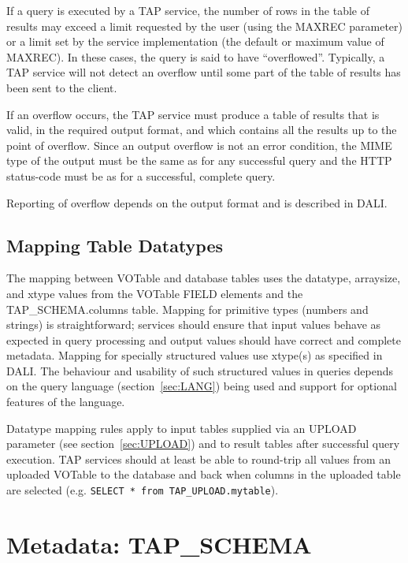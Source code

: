\documentclass[11pt,letter]{ivoa}
\begin{document}
If a query is executed by a TAP service, the number of rows in the table of 
results may exceed a limit requested by the user (using the MAXREC parameter) 
or a limit set by the service implementation (the default or maximum value of 
MAXREC). In these cases, the query is said to have ``overflowed''. Typically, a 
TAP service will not detect an overflow until some part of the table of results 
has been sent to the client.

If an overflow occurs, the TAP service must produce a table of results that is 
valid, in the required output format, and which contains all the results up to 
the point of overflow. Since an output overflow is not an error condition, the 
MIME type of the output must be the same as for any successful query and the 
HTTP status-code must be as for a successful, complete query.

Reporting of overflow depends on the output format and is described in DALI.

\subsection{Mapping Table Datatypes}
\label{sec:vot-rdbms}

The mapping between VOTable and database tables uses the datatype, arraysize, and xtype values from 
the VOTable FIELD elements and the TAP\kern-3pt\_SCHEMA.columns table. Mapping for primitive types 
(numbers and strings) is straightforward; services should ensure that input values behave as 
expected in query processing and output values should have correct and complete metadata. Mapping for specially
structured values use xtype(s) as specified in DALI. The behaviour and usability of such structured values in 
queries depends on the query language (section~\ref{sec:LANG}) being used and support for optional features 
of the language.

Datatype mapping rules apply to input tables supplied via an UPLOAD parameter (see section~\ref{sec:UPLOAD}) 
and to result tables after successful query execution.  TAP services should at least be able to round-trip all
values from an uploaded VOTable to the database and back when columns in the uploaded table are selected (e.g.
\verb|SELECT * from TAP_UPLOAD.mytable|).

\section{Metadata: TAP\kern-3pt\_SCHEMA}
\label{sec:tap-schema}
\end{document}
